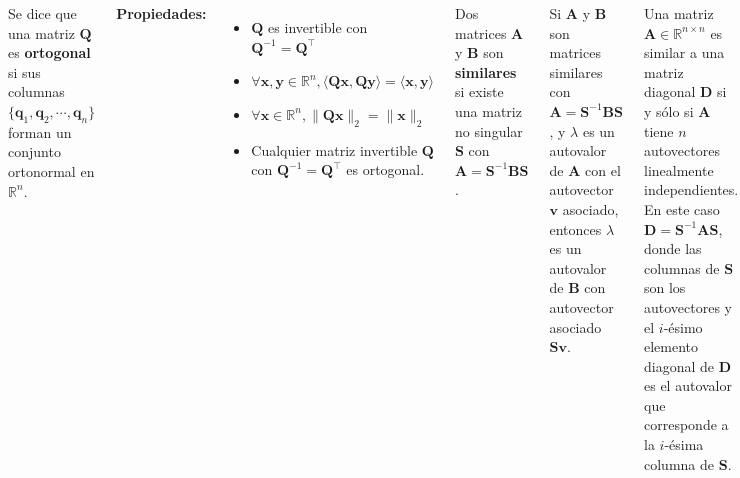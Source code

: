 \documentclass[9pt, aspectratio=169]{beamer}
\begin{document}
\begin{frame}
	\begin{columns}[t]
		\cx
		\begin{definition}
			Se dice que una matriz $\bm{Q}$ es \textbf{ortogonal} si sus columnas $\{ \bm{q}_1,  \bm{q}_2, \cdots, \bm{q}_n \}$ forman un conjunto ortonormal en $\mathbb{R}^n$.
		\end{definition} \pause
		\textbf{Propiedades:}
		\begin{itemize}
			\item $\bm{Q}$ es invertible con $\bm{Q}^{-1} = \bm{Q}^{\intercal}$
			\item $\forall \bm{x}, \bm{y} \in \mathbb{R}^n, \langle \bm{Q}\bm{x}, \bm{Q} \bm{y} \rangle = \langle \bm{x}, \bm{y} \rangle$
			\item $\forall \bm{x} \in \mathbb{R}^n, \lVert \bm{Q} \bm{x} \rVert_2 = \lVert \bm{x} \rVert_2$
			\item Cualquier matriz invertible $\bm{Q}$ con $\bm{Q}^{-1} = \bm{Q}^{\intercal}$ es ortogonal.
		\end{itemize} \pause

		\begin{definition}
			Dos matrices $\bm{A}$ y $\bm{B}$ son \textbf{similares} si existe una matriz no singular $\bm{S}$ con $\bm{A} = \bm{S}^{-1} \bm{B} \bm{S}$.
		\end{definition} \pause

		\cx
		\begin{theorem}
			Si $\bm{A}$ y $\bm{B}$ son matrices similares con $\bm{A} = \bm{S}^{-1} \bm{B} \bm{S}$, y $\lambda$ es un autovalor de $\bm{A}$ con el autovector $\bm{v}$ asociado, entonces $\lambda$ es un autovalor de $\bm{B}$ con autovector asociado $\bm{S} \bm{v}$.
		\end{theorem} \pause

		\begin{theorem}
			Una matriz $ \bm{A} \in \mathbb{R}^{n \times n} $ es similar a una matriz diagonal $\bm{D}$ si y sólo si $\bm{A}$ tiene $n$ autovectores linealmente independientes. En este caso $\bm{D} = \bm{S}^{-1} \bm{A} \bm{S}$, donde las columnas de $\bm{S}$ son los autovectores y el $i$-ésimo elemento diagonal de $\bm{D}$ es el autovalor que corresponde a la $i$-ésima columna de $\bm{S}$.
		\end{theorem}
	\end{columns}
\end{frame}
\end{document}
